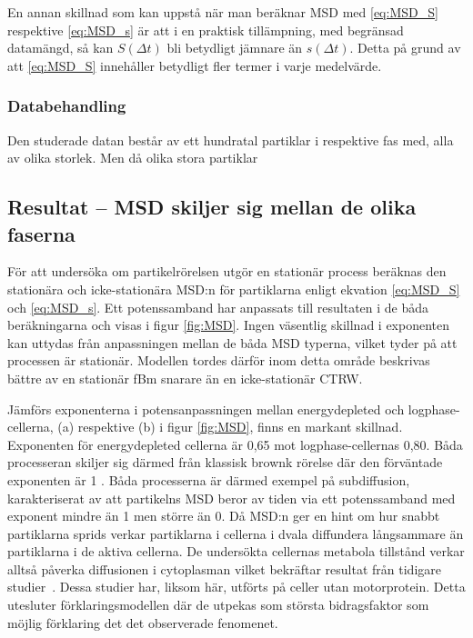 En annan skillnad som kan uppstå när man beräknar MSD med \eqref{eq:MSD_S} respektive \eqref{eq:MSD_s} är att i en praktisk tillämpning, med begränsad datamängd, så kan $S(\Delta{t})$ bli betydligt jämnare än $s(\Delta{t})$. Detta på grund av att \eqref{eq:MSD_S} innehåller betydligt fler termer i varje medelvärde. 

\subsubsection{Databehandling}
Den studerade datan består av ett hundratal partiklar i respektive fas med, alla av olika storlek. Men då olika stora partiklar 


\subsection{Resultat -- MSD skiljer sig mellan de olika faserna}

För att undersöka om partikelrörelsen utgör en stationär process beräknas den stationära och icke-stationära MSD:n för partiklarna enligt ekvation \eqref{eq:MSD_S} och \eqref{eq:MSD_s}. Ett potenssamband har anpassats till resultaten i de båda beräkningarna och visas i figur \ref{fig:MSD}. 
Ingen väsentlig skillnad i exponenten kan uttydas från anpassningen mellan de båda MSD typerna, vilket tyder på att processen är stationär. Modellen tordes därför inom detta område beskrivas bättre av en stationär fBm snarare än en icke-stationär CTRW.

Jämförs exponenterna i potensanpassningen mellan energydepleted och logphase-cellerna, (a) respektive (b) i figur \ref{fig:MSD}, finns en markant skillnad. Exponenten för energydepleted cellerna är  0,65 mot logphase-cellernas 0,80. Båda processeran skiljer sig därmed från klassisk brownk rörelse där den förväntade exponenten är 1 \cite{}. Båda processerna är därmed exempel på subdiffusion, karakteriserat av att partikelns MSD beror av tiden via ett potenssamband med exponent mindre än 1 men större än 0. Då MSD:n ger en hint om hur snabbt partiklarna sprids verkar partiklarna i cellerna i dvala diffundera långsammare än partiklarna i de aktiva cellerna. De undersökta cellernas metabola tillstånd verkar alltså påverka diffusionen i cytoplasman vilket bekräftar resultat från tidigare studier~\cite{Parry_etal2014}. Dessa studier har, liksom här, utförts på celler utan motorprotein. Detta utesluter förklaringsmodellen där de utpekas som största bidragsfaktor som möjlig förklaring det det observerade fenomenet. 

